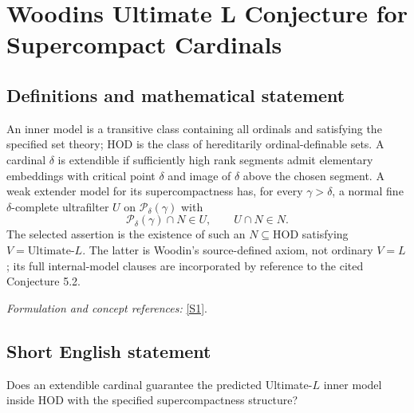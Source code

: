 \documentclass[11pt]{article}
\begin{document}
\section*{\texorpdfstring{Woodins Ultimate L Conjecture for Supercompact Cardinals}{Woodins Ultimate L Conjecture for Supercompact Cardinals}}\label{75}
\subsection{Definitions and mathematical statement}
An inner model is a transitive class containing all ordinals and satisfying the specified set theory; $\mathrm{HOD}$ is the class of hereditarily ordinal-definable sets. A cardinal $\delta$ is extendible if sufficiently high rank segments admit elementary embeddings with critical point $\delta$ and image of $\delta$ above the chosen segment. A weak extender model for its supercompactness has, for every $\gamma>\delta$, a normal fine $\delta$-complete ultrafilter $U$ on $\mathcal P_\delta(\gamma)$ with
\[
 \mathcal P_\delta(\gamma)\cap N\in U,\qquad U\cap N\in N.
\]
The selected assertion is the existence of such an $N\subseteq\mathrm{HOD}$ satisfying $V=\mathrm{Ultimate}\text{-}L$. The latter is Woodin's source-defined axiom, not ordinary $V=L$; its full internal-model clauses are incorporated by reference to the cited Conjecture 5.2.
\par\smallskip\textit{Formulation and concept references:} \href{https://www.cambridge.org/core/journals/review-of-symbolic-logic/article/steels-programme-evidential-framework-the-core-and-ultimatel/22BC5068C2DC48CC899C60E1445A7792}{[S1]}.

\subsection{Short English statement}
Does an extendible cardinal guarantee the predicted Ultimate-$L$ inner model inside HOD with the specified supercompactness structure?
\end{document}
